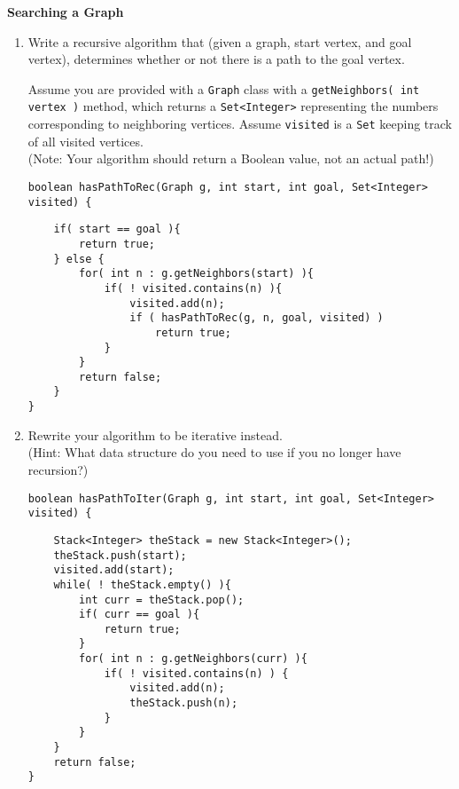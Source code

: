 \textbf{Searching a Graph}
	\begin{enumerate}
		\item
			Write a recursive algorithm that (given a graph, start vertex, and goal vertex),
			determines whether or not there is a path to the goal vertex.

            Assume you are provided with a \texttt{Graph} class with a \texttt{getNeighbors( int vertex )} method, which returns a \texttt{Set\textless Integer\textgreater} representing the numbers corresponding to neighboring vertices. Assume \texttt{visited} is a \texttt{Set} keeping track of all visited vertices. \\
			(Note: Your algorithm should return a Boolean value, not an actual path!)
\begin{verbatim}
boolean hasPathToRec(Graph g, int start, int goal, Set<Integer> visited) {
\end{verbatim}
			
\begin{answer}
\begin{lstlisting}
	if( start == goal ){
		return true;
	} else {
		for( int n : g.getNeighbors(start) ){
			if( ! visited.contains(n) ){
				visited.add(n);
				if ( hasPathToRec(g, n, goal, visited) )
					return true;
			}
		}
		return false;
	}
}
\end{lstlisting}
\end{answer}
		            
		\item
			Rewrite your algorithm to be iterative instead. \\
			(Hint: What data structure do you need to use if you no longer have recursion?)
\begin{verbatim}
boolean hasPathToIter(Graph g, int start, int goal, Set<Integer> visited) {
\end{verbatim}	
			
\begin{answer}
\begin{lstlisting}
	Stack<Integer> theStack = new Stack<Integer>();
	theStack.push(start);
	visited.add(start);
	while( ! theStack.empty() ){
		int curr = theStack.pop();
		if( curr == goal ){
			return true;
		}
		for( int n : g.getNeighbors(curr) ){
			if( ! visited.contains(n) ) {
				visited.add(n);
				theStack.push(n);
			}
		}
	}
	return false;
}
\end{lstlisting}
\end{answer}
	\end{enumerate}
